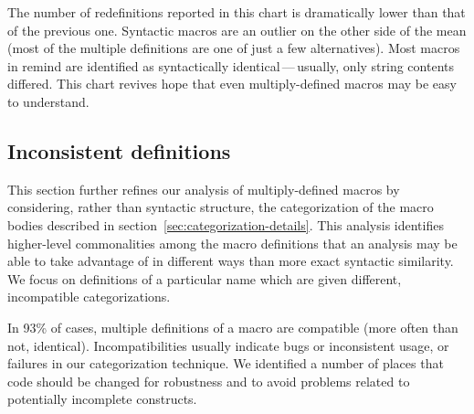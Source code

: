 \documentclass[10pt]{article}
\newcommand{\pkg}[1]{\textsf{#1}}
\begin{document}
The number of redefinitions reported in this chart is dramatically lower
than that of the previous one.  Syntactic macros are an outlier on the
other side of the mean (most of the multiple definitions are one of just a
few alternatives).  Most macros in \pkg{remind} are identified as
syntactically identical\,---\,usually, only string contents differed.  This
chart revives hope that even multiply-defined macros may be easy to
understand.


\subsection{Inconsistent definitions}
\label{sec:inconsistent}

This section further refines our analysis of multiply-defined macros by
considering, rather than syntactic structure, the categorization of the
macro bodies described in section~\ref{sec:categorization-details}.  This
analysis identifies higher-level commonalities among the macro definitions
that an analysis may be able to take advantage of in different ways than
more exact syntactic similarity.  We focus on definitions of a particular
name which are given different, incompatible categorizations.

In 93\% of cases, multiple definitions of a macro are compatible (more
often than not, identical).  Incompatibilities usually indicate bugs or
inconsistent usage, or failures in our categorization technique.  We
identified a number of places that code should be changed for robustness
and to avoid problems related to potentially incomplete constructs.
\end{document}
